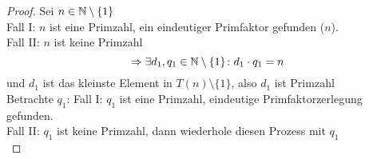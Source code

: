 \begin{proof}
	Sei $n \in \mathbb{N} \setminus\{1\}$\\
	Fall I: $n$ ist eine Primzahl, ein eindeutiger Primfaktor gefunden ($n$).\\
	Fall II: $n$ ist keine Primzahl\\
	\begin{equation*}
		\Rightarrow \exists d_1, q_1 \in \mathbb{N} \setminus\{1\} \colon d_1 \cdot q_1 = n
	\end{equation*}
	und $d_1$ ist das kleinste Element in $T(n)\setminus\{1\}$, also $d_1$ ist Primzahl\\
	Betrachte $q_1$:
	Fall I: $q_1$ ist eine Primzahl, eindeutige Primfaktorzerlegung gefunden.\\
	Fall II: $q_1$ ist keine Primzahl, dann wiederhole diesen Prozess mit $q_1$\\ 
	\qedhere
\end{proof}
% 
